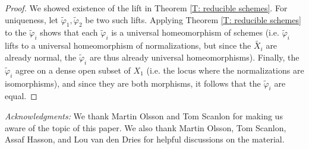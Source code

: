 \documentclass{amsart}
\theoremstyle{definition}
\begin{document}
    \begin{proof}
        We showed existence of the lift in Theorem \ref{T: reducible schemes}. For uniqueness, let $\widetilde\varphi_1,\widetilde\varphi_2$ be two such lifts. Applying Theorem \ref{T: reducible schemes} to the $\widetilde\varphi_i$ shows that each $\widetilde\varphi_i$ is a universal homeomorphism of schemes (i.e. $\widetilde\varphi_i$ lifts to a universal homeomorphism of normalizations, but since the $\widetilde{X_i}$ are already normal, the $\widetilde\varphi_i$ are thus already universal homeomorphisms). Finally, the $\widetilde\varphi_i$ agree on a dense open subset of $X_1$ (i.e. the locus where the normalizations are isomorphisms), and since they are both morphisms, it follows that the $\widetilde\varphi_i$ are equal.
    \end{proof}

\noindent\textit{Acknowledgments:} We thank Martin Olsson and Tom Scanlon for making us aware of the topic of this paper. We also thank Martin Olsson, Tom Scanlon, Assaf Hasson, and Lou van den Dries for helpful discussions on the material.



\end{document}
